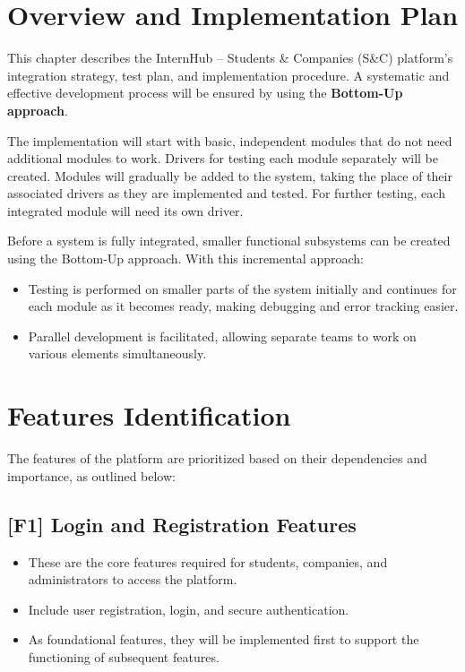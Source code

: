 \section{Overview and Implementation Plan}
\label{sec:overview_implementation}

This chapter describes the InternHub – Students \& Companies (S\&C) platform's integration strategy, test plan, and implementation procedure. A systematic and effective development process will be ensured by using the \textbf{Bottom-Up approach}.

The implementation will start with basic, independent modules that do not need additional modules to work. Drivers for testing each module separately will be created. Modules will gradually be added to the system, taking the place of their associated drivers as they are implemented and tested. For further testing, each integrated module will need its own driver.

Before a system is fully integrated, smaller functional subsystems can be created using the Bottom-Up approach. With this incremental approach:
\begin{itemize}
    \item Testing is performed on smaller parts of the system initially and continues for each module as it becomes ready, making debugging and error tracking easier.
    \item Parallel development is facilitated, allowing separate teams to work on various elements simultaneously.
\end{itemize}

\section{Features Identification}
\label{sec:features_identification}

The features of the platform are prioritized based on their dependencies and importance, as outlined below:

\subsection{[F1] Login and Registration Features}
\begin{itemize}
    \item These are the core features required for students, companies, and administrators to access the platform.
    \item Include user registration, login, and secure authentication.
    \item As foundational features, they will be implemented first to support the functioning of subsequent features.
\end{itemize}

